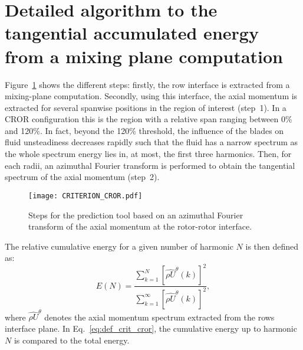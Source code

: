 \section{Detailed algorithm to the tangential accumulated energy from a mixing plane computation}
\label{app:epsilon_cror_steps}
Figure~\ref{fig:criterion_cror} shows the different steps: firstly, the row
interface is extracted from a mixing-plane computation.
Secondly, using this interface,
the axial momentum is extracted for several spanwise positions in the region of interest
(step~\textcircled{\small{1}}).
In a CROR configuration this is the region with a 
relative span ranging between 0\% and 120\%.
In fact, beyond the 120\% threshold, the influence of the blades on fluid
unsteadiness decreases rapidly such that the fluid 
has a narrow spectrum as the whole spectrum energy lies in, at
most, the first three harmonics.
Then, for each radii, an azimuthal Fourier transform
is performed to obtain the tangential spectrum of the
axial momentum (step~\textcircled{\small{2}}).
\begin{figure}[htp]
  \centering
  \texttt{[image: CRITERION\_CROR.pdf]}
  \caption{Steps for the prediction tool based on an azimuthal
  Fourier transform of the axial momentum at the rotor-rotor interface.}
  \label{fig:criterion_cror}
\end{figure}
The relative cumulative energy for a given number of harmonic $N$ is then defined as:
\begin{equation}
    E (N) = \frac{\sum_{k=1}^N \left[ \widehat{\rho U}^{\theta} (k) \right]^2}{ 
    \sum_{k=1}^\infty \left[ \widehat{\rho U}^{\theta} (k) \right]^2},
    \label{eq:def_crit_cror}
\end{equation} 
where $\widehat{\rho U}^{\theta}$ denotes the axial momentum spectrum
extracted from the rows interface plane. In Eq.~\eqref{eq:def_crit_cror},
the cumulative energy up to harmonic $N$ is 
compared to the total energy.
